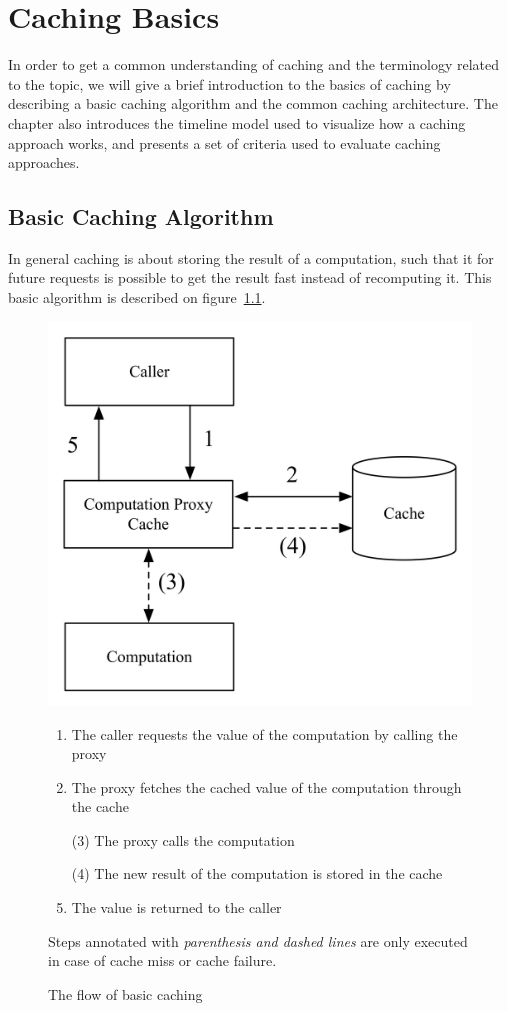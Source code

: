 \chapter{Caching Basics}
\label{chapter:caching-model}

In order to get a common understanding of caching and the terminology related to the topic, we will give a brief introduction to the basics of caching by describing a basic caching algorithm and the common caching architecture. The chapter also introduces the timeline model used to visualize how a caching approach works, and presents a set of criteria used to evaluate caching approaches.

\section{Basic Caching Algorithm}
\label{sec:caching_basics}

In general caching is about storing the result of a computation, such that it for future requests is possible to get the result fast instead of recomputing it. This basic algorithm is described on figure~\ref{fig:basic-caching}.

\begin{figure}[ht!]
  \begin{center}
    \includegraphics[width=0.6\linewidth]{figures/basic-caching-figure.png}
  \end{center}
  \begin{enumerate}
    \item The caller requests the value of the computation by calling the proxy
    \item The proxy fetches the cached value of the computation through the cache
    \item[(3)] The proxy calls the computation
    \item[(4)] The new result of the computation is stored in the cache
    \item The value is returned to the caller
  \end{enumerate}
  \footnotesize{Steps annotated with \emph{parenthesis and dashed lines} are only executed in case of cache miss or cache failure.}
  \caption{The flow of basic caching}
  \label{fig:basic-caching}
\end{figure}


